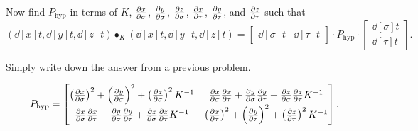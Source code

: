 \documentclass[newpage,hints,handout]{ximera}
\begin{document}
\begin{problem}
  Now find $P_\mathrm{hyp}$ in terms of $K$, $\pp[x]{\sigma}$, $\pp[y]{\sigma}$,
  $\pp[z]{\sigma}$, $\pp[x]{\tau}$, $\pp[y]{\tau}$, and $\pp[z]{\tau}$
  such that
  \[
  \left(\dd[x]{t}, \dd[y]{t}, \dd[z]{t}\right)\bullet_K
  \left(\dd[x]{t}, \dd[y]{t}, \dd[z]{t}\right)
  =
  \begin{bmatrix}
    \dd[\sigma]{t} &  \dd[\tau]{t}
  \end{bmatrix}
  \cdot P_\mathrm{hyp}
  \cdot
  \begin{bmatrix}
    \dd[\sigma]{t} \\  \dd[\tau]{t}
  \end{bmatrix}.
  \]
  \begin{hint}
    Simply write down the answer from a previous problem.
  \end{hint}
  \begin{freeResponse}
    \[
    P_\mathrm{hyp} =
    \begin{bmatrix}
        \left(\pp[x]{\sigma}\right)^2 + \left(\pp[y]{\sigma}\right)^2 + \left(\pp[z]{\sigma}\right)^2K^{-1} & \pp[x]{\sigma}\pp[x]{\tau} + \pp[y]{\sigma}\pp[y]{\tau} + \pp[z]{\sigma}\pp[z]{\tau} K^{-1}\\
        \pp[x]{\sigma}\pp[x]{\tau} + \pp[y]{\sigma}\pp[y]{\tau} + \pp[z]{\sigma}\pp[z]{\tau} K^{-1}       & \left(\pp[x]{\tau}\right)^2 + \left(\pp[y]{\tau}\right)^2 + \left(\pp[z]{\tau}\right)^2K^{-1}
      \end{bmatrix}.
    \]
  \end{freeResponse}
\end{problem}
\end{document}
